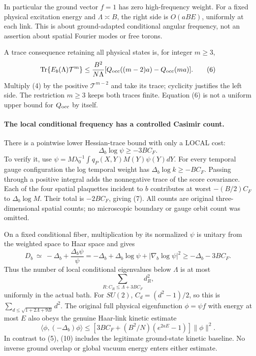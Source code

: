 \documentclass[11pt]{article}
\begin{document}
In particular the ground vector $f=1$ has zero high-frequency weight. For a
fixed physical excitation energy and $\Lambda\asymp B$, the right side is
$O(aBE)$, uniformly at each link. This is about ground-adapted conditional angular
frequency, not an assertion about spatial Fourier modes or free torons.

A trace consequence retaining all physical states is, for integer $m\ge3$,
\[
 \operatorname{Tr}\{E_b(\Lambda)\mathcal T^m\}
 \le\frac{B^2}{N\Lambda}
   [Q_{\rm occ}((m-2)a)-Q_{\rm occ}(ma)].              \tag{6}
\]
Multiply (4) by the positive $\mathcal T^{m-2}$ and take its trace; cyclicity
justifies the left side. The restriction $m\ge3$ keeps both traces finite.
Equation (6) is not a uniform upper bound for $Q_{\rm occ}$ by itself.

\paragraph{The local conditional frequency has a controlled Casimir count.}
There is a pointwise lower Hessian-trace bound with only a LOCAL cost:
\[
 \Delta_b\log\psi\ge-3 B C_F.                         \tag{7}
\]
To verify it, use $\psi=M\lambda_0^{-1}\int q_P(X,Y)M(Y)\psi(Y)dY$.
For every temporal gauge configuration the log temporal weight has
$\Delta_b\log k\ge-B C_F$. Passing through a positive integral adds the
nonnegative trace of the score covariance. Each of the four spatial plaquettes
incident to $b$ contributes at worst $-(B/2)C_F$ to $\Delta_b\log M$.
Their total is $-2BC_F$, giving (7). All counts are original three-dimensional
spatial counts; no microscopic boundary or gauge orbit count was omitted.

On a fixed conditional fiber, multiplication by its normalized $\psi$ is
unitary from the weighted space to Haar space and gives
\[
 D_b\ \simeq\ -\Delta_b+\frac{\Delta_b\psi}{\psi}
 =-\Delta_b+\Delta_b\log\psi+|\nabla_b\log\psi|^2
 \ge-\Delta_b-3BC_F.                                 \tag{8}
\]
Thus the number of local conditional eigenvalues below $\Lambda$ is at most
\[
 \sum_{R:C_R\le\Lambda+3BC_F}d_R^2,                  \tag{9}
\]
uniformly in the actual bath. For $SU(2)$, $C_d=(d^2-1)/2$, so this is
$\sum_{d\le\sqrt{1+2\Lambda+9B}}d^2$.
The original full physical eigenfunction $\phi=\psi f$ with energy at most $E$
also obeys the genuine Haar-link kinetic estimate
\[
 \langle\phi,(-\Delta_b)\phi\rangle
 \le[3BC_F+(B^2/N)(e^{2aE}-1)]\|\phi\|^2.             \tag{10}
\]
In contrast to (5), (10) includes the legitimate ground-state kinetic baseline.
No inverse ground overlap or global vacuum energy enters either estimate.
\end{document}
